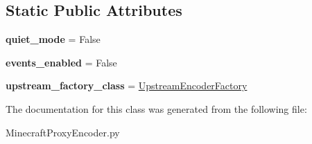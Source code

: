 \subsection*{Static Public Attributes}
\begin{DoxyCompactItemize}
\item 
\hypertarget{classMinecraftProxyEncoder_1_1MinecraftProxyBridge_a64507dfd55d2b140bd6cf62b454c1d96}{{\bfseries quiet\-\_\-mode} = False}\label{classMinecraftProxyEncoder_1_1MinecraftProxyBridge_a64507dfd55d2b140bd6cf62b454c1d96}

\item 
\hypertarget{classMinecraftProxyEncoder_1_1MinecraftProxyBridge_a36cc22a3da768073ae0f5c64e16b9876}{{\bfseries events\-\_\-enabled} = False}\label{classMinecraftProxyEncoder_1_1MinecraftProxyBridge_a36cc22a3da768073ae0f5c64e16b9876}

\item 
\hypertarget{classMinecraftProxyEncoder_1_1MinecraftProxyBridge_a2ababd31cb2f72360d032b61720dbcde}{{\bfseries upstream\-\_\-factory\-\_\-class} = \hyperlink{classMinecraftProxyEncoder_1_1UpstreamEncoderFactory}{Upstream\-Encoder\-Factory}}\label{classMinecraftProxyEncoder_1_1MinecraftProxyBridge_a2ababd31cb2f72360d032b61720dbcde}

\end{DoxyCompactItemize}


The documentation for this class was generated from the following file\-:\begin{DoxyCompactItemize}
\item 
Minecraft\-Proxy\-Encoder.\-py\end{DoxyCompactItemize}
